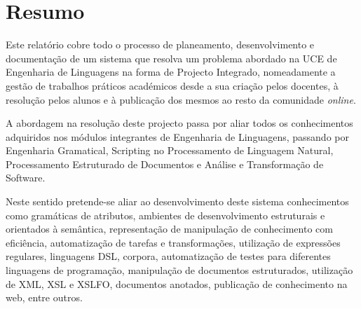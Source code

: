 \section{Resumo}

  Este relatório cobre todo o processo de planeamento, desenvolvimento e
  documentação de um sistema que resolva um problema abordado na UCE de
  Engenharia de Linguagens na forma de Projecto Integrado, nomeadamente
  a gestão de trabalhos práticos académicos desde a sua criação pelos docentes, à resolução pelos alunos
  e à publicação dos mesmos ao resto da comunidade \textit{online}.

  A abordagem na resolução deste projecto passa por aliar todos os conhecimentos
  adquiridos nos módulos integrantes de Engenharia de Linguagens, passando por
 Engenharia Gramatical, Scripting no Processamento de Linguagem Natural, Processamento
 Estruturado de Documentos e Análise e Transformação de Software.

 Neste sentido pretende-se aliar ao desenvolvimento deste sistema conhecimentos
 como gramáticas de atributos, ambientes de desenvolvimento estruturais e
 orientados à semântica, representação de manipulação de conhecimento com
 eficiência, automatização de tarefas e transformações, utilização de expressões
 regulares, linguagens DSL, corpora, automatização de testes para diferentes
 linguagens de programação, manipulação de documentos estruturados, utilização
 de XML, XSL e XSLFO, documentos anotados, publicação de conhecimento na web,
 entre outros.
